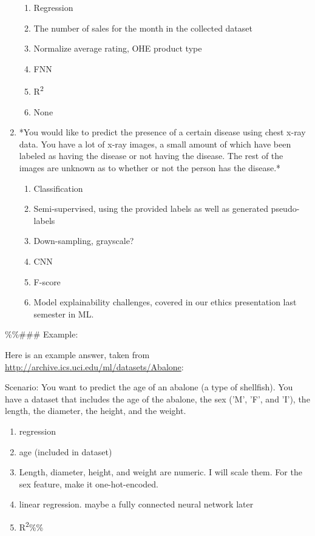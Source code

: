 \documentclass[letterpaper]{article}
\begin{document}
\begin{enumerate}
\begin{enumerate}
\item Regression
\item The number of sales for the month in the collected dataset
\item Normalize average rating, OHE product type
\item FNN
\item R\textsuperscript{2}
\item None
\end{enumerate}

\item *You would like to predict the presence of a certain disease using
chest x-ray data. You have a lot of x-ray images, a small amount of
which have been labeled as having the disease or not having the
disease. The rest of the images are unknown as to whether or not the
person has the disease.*

\begin{enumerate}
\item Classification
\item Semi-supervised, using the provided labels as well as generated
pseudo-labels
\item Down-sampling, grayscale?
\item CNN
\item F-score
\item Model explainability challenges, covered in our ethics
presentation last semester in ML.
\end{enumerate}
\end{enumerate}

\%\%\#\#\# Example:

Here is an example answer, taken from
\url{http://archive.ics.uci.edu/ml/datasets/Abalone}:

Scenario: You want to predict the age of an abalone (a type of
shellfish). You have a dataset that includes the age of the abalone, the
sex ('M', 'F', and 'I'), the length, the diameter, the height, and the
weight.

\begin{enumerate}
\item regression
\item age (included in dataset)
\item Length, diameter, height, and weight are numeric. I will scale them.
For the sex feature, make it one-hot-encoded.
\item linear regression. maybe a fully connected neural network later
\item R\textsuperscript{2}\%\%
\end{enumerate}
\end{document}
